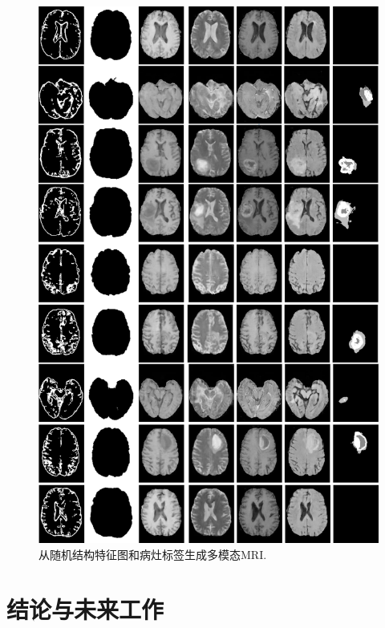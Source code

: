 \documentclass[letterpaper]{article} %
\begin{document}
\begin{figure}
	\centering
	\includegraphics[width=0.98\linewidth]{figures/F_to_MRI}
	\caption{从随机结构特征图和病灶标签生成多模态MRI.}
	\label{generated_mri}
\end{figure}

\section{结论与未来工作}
\end{document}
